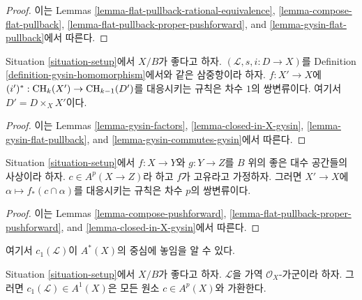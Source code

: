 \begin{proof}
이는 Lemmas
\ref{lemma-flat-pullback-rational-equivalence},
\ref{lemma-compose-flat-pullback},
\ref{lemma-flat-pullback-proper-pushforward}, and
\ref{lemma-gysin-flat-pullback}에서 따른다.
\end{proof}

\begin{lemma}
\label{lemma-gysin-bivariant}
Situation \ref{situation-setup}에서 $X/B$가 좋다고 하자.
$(\mathcal{L}, s, i : D \to X)$를 Definition
\ref{definition-gysin-homomorphism}에서와 같은 삼중항이라 하자.
$f : X' \to X$에
$(i')^* : \mathop{\mathrm{CH}}\nolimits_k(X') \to \mathop{\mathrm{CH}}\nolimits_{k - 1}(D')$를 대응시키는 규칙은
차수 $1$의 쌍변류이다. 여기서 $D' = D \times_X X'$이다.
\end{lemma}

\begin{proof}
이는 Lemmas \ref{lemma-gysin-factors},
\ref{lemma-closed-in-X-gysin},
\ref{lemma-gysin-flat-pullback}, and
\ref{lemma-gysin-commutes-gysin}에서 따른다.
\end{proof}

\begin{lemma}
\label{lemma-push-proper-bivariant}
Situation \ref{situation-setup}에서
$f : X \to Y$와 $g : Y \to Z$를
$B$ 위의 좋은 대수 공간들의 사상이라 하자.
$c \in A^p(X \to Z)$라 하고 $f$가 고유라고 가정하자.
그러면 $X' \to X$에
$\alpha \longmapsto f_*(c \cap \alpha)$를 대응시키는 규칙은
차수 $p$의 쌍변류이다.
\end{lemma}

\begin{proof}
이는 Lemmas \ref{lemma-compose-pushforward},
\ref{lemma-flat-pullback-proper-pushforward}, and
\ref{lemma-closed-in-X-gysin}에서 따른다.
\end{proof}

\noindent
여기서 $c_1(\mathcal{L})$이 $A^*(X)$의 중심에 놓임을 알 수 있다.

\begin{lemma}
\label{lemma-c1-center}
Situation \ref{situation-setup}에서 $X/B$가 좋다고 하자.
$\mathcal{L}$을 가역 $\mathcal{O}_X$-가군이라 하자.
그러면 $c_1(\mathcal{L}) \in A^1(X)$은 모든 원소
$c \in A^p(X)$와 가환한다.
\end{lemma}

